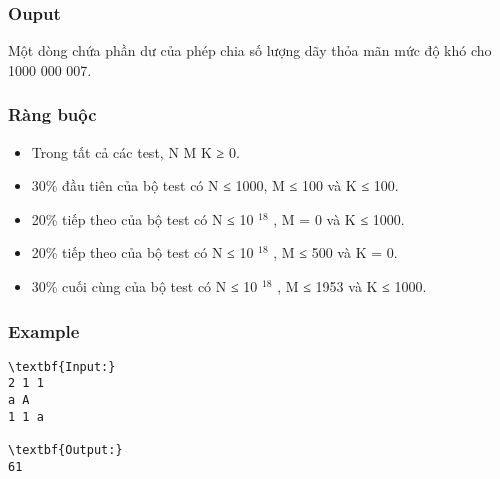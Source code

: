 \subsubsection{Ouput}

Một dòng chứa phần dư của phép chia số lượng dãy thỏa mãn mức độ khó cho 1000 000 007.

\subsubsection{Ràng buộc}
\begin{itemize}
	\item Trong tất cả các test, N M K ≥ 0.
	\item 30\% đầu tiên của bộ test có N ≤ 1000, M ≤ 100 và K ≤ 100.
	\item 20\% tiếp theo của bộ test có N ≤ 10 $^ 18 $ , M = 0 và K ≤ 1000.
	\item 20\% tiếp theo của bộ test có N ≤ 10 $^ 18 $ , M ≤ 500 và K = 0.
	\item 30\% cuối cùng của bộ test có N ≤ 10 $^ 18 $ , M ≤ 1953 và K ≤ 1000.
\end{itemize}

\subsubsection{Example}
\begin{verbatim}
\textbf{Input:}
2 1 1
a A
1 1 a

\textbf{Output:}
61
\end{verbatim}